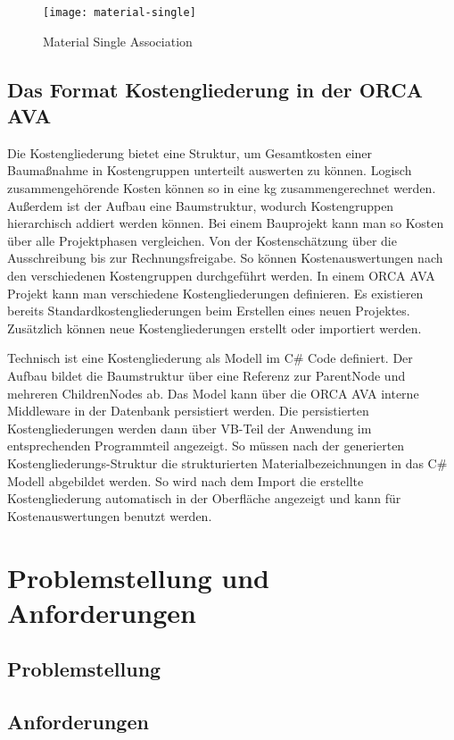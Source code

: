 \begin{figure}[h]
	\centering
	\texttt{[image: material-single]}
	\caption[IfcMaterial]{Material Single Association}
	\label{fig:material-single}
\end{figure}

\subsection{Das Format Kostengliederung in der ORCA AVA}
\label{s:basics:coststructure}
Die Kostengliederung bietet eine Struktur, um Gesamtkosten einer Baumaßnahme in Kostengruppen unterteilt auswerten zu können. Logisch zusammengehörende Kosten können so in eine \ac{kg} zusammengerechnet werden. Außerdem ist der Aufbau eine Baumstruktur, wodurch Kostengruppen hierarchisch addiert werden können. 
Bei einem Bauprojekt kann man so Kosten über alle Projektphasen vergleichen. Von der Kostenschätzung über die  Ausschreibung bis zur Rechnungsfreigabe. So können Kostenauswertungen nach den verschiedenen Kostengruppen durchgeführt werden. In einem ORCA AVA Projekt kann man verschiedene Kostengliederungen definieren. Es existieren bereits Standardkostengliederungen beim Erstellen eines neuen Projektes. Zusätzlich können neue Kostengliederungen erstellt oder importiert werden.\citep{noauthor_undated-bx}


Technisch ist eine Kostengliederung als Modell im C\# Code definiert. Der Aufbau bildet die Baumstruktur über eine Referenz zur ParentNode und mehreren ChildrenNodes ab. Das Model kann über die ORCA AVA interne Middleware in der Datenbank persistiert werden. Die persistierten Kostengliederungen werden dann über VB-Teil der Anwendung im entsprechenden Programmteil angezeigt.
So müssen nach der generierten Kostengliederungs-Struktur die strukturierten Materialbezeichnungen in das C\# Modell abgebildet werden. So wird nach dem Import die erstellte Kostengliederung automatisch in der Oberfläche angezeigt und kann für Kostenauswertungen benutzt werden.

\newpage
\section{Problemstellung und Anforderungen}
\label{s:requirements}
\subsection{Problemstellung}
\label{s:requirements:problem}
\subsection{Anforderungen}
\label{s:requirements:requirements}
